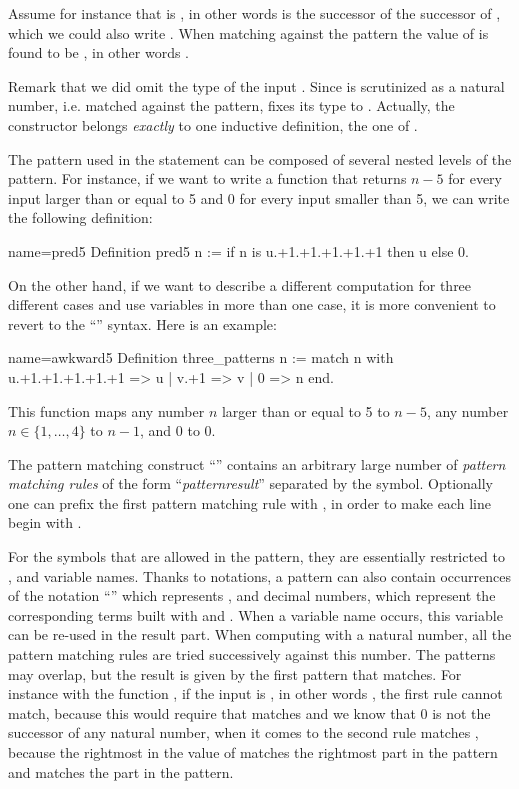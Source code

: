Assume for instance that  is , in other words  is the
successor of the successor of , which we could also write
.  When matching  against the pattern 
the value of  is found to be , in other words .

Remark that we did omit the type of the input .  Since  is scrutinized
as a natural number, i.e. matched against the  pattern, \Coq{} fixes its
type to .  Actually, the  constructor belongs \emph{exactly}
to one inductive definition, the one of .

The pattern used in the  statement can be composed of
several nested levels of the  pattern.  For instance,
if we want to write a function
that returns \(n-5\) for every input larger than or equal to 5 and 0
for every input smaller than 5, we can write the following definition:

\begin{coq}{name=pred5}{}
Definition pred5 n :=
  if n is u.+1.+1.+1.+1.+1 then u else 0.
\end{coq}
On the other hand, if we want to describe a different computation for
three different cases and use variables in more than one case, it is
more convenient
to revert to the ``'' syntax.  Here is an
example:

\begin{coq}{name=awkward5}{}
Definition three_patterns n :=
  match n with
    u.+1.+1.+1.+1.+1 => u
  | v.+1 => v
  | 0 => n
  end.
\end{coq}
This function maps any number \(n\) larger than or equal to 5 to \(n-5\),
any number \(n \in \{1, \ldots, 4\}\) to \(n-1\), and \(0\) to \(0\).

The pattern matching construct ``'' contains an
arbitrary large number of {\em pattern matching rules} of the form
``\emph{pattern}\C{ =>$~$}\emph{result}'' 
separated by the \C{|} symbol.  Optionally one can
prefix the first pattern matching rule with \C{|}, in order to make each line
begin with \C{|}.

For the symbols that are allowed
in the pattern, they are essentially restricted to ,  and
variable names.  Thanks to notations, a pattern can also contain
occurrences of the notation ``'' which represents , and
decimal numbers, which represent the corresponding terms built with
 and .  When a variable name occurs, this variable can be
re-used in the result part.  When computing with a natural number, all
the pattern matching rules are tried successively against this number.  The
patterns may overlap, but the result is given by the first pattern that
matches.
For instance with the function , if the input is , in other words , the first
rule cannot match, because this would require that  matches
 and we know that \(0\) is not the successor of any
natural number, when it comes to the second rule  matches
, because the rightmost  in the value of  matches
the rightmost  part in the pattern and  matches the  part
in the pattern.

